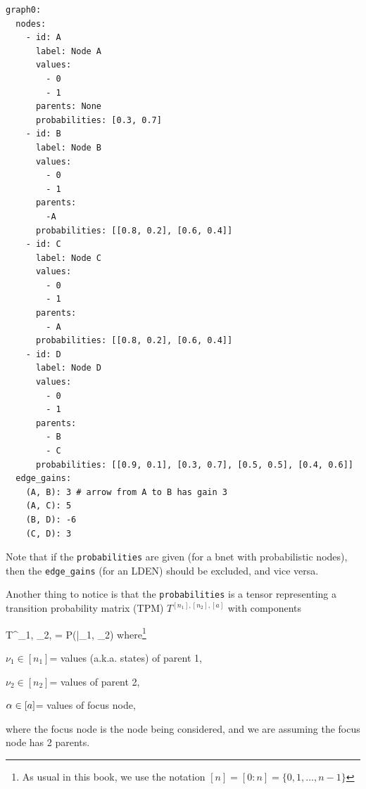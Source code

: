 \begin{mdframed}[hidealllines=true,backgroundcolor=blue!10]
\begin{verbatim}
graph0:
  nodes:
    - id: A
      label: Node A
      values: 
        - 0 
        - 1
      parents: None
      probabilities: [0.3, 0.7]
    - id: B
      label: Node B
      values: 
        - 0 
        - 1
      parents:
        -A
      probabilities: [[0.8, 0.2], [0.6, 0.4]]
    - id: C
      label: Node C
      values:
        - 0
        - 1
      parents: 
        - A   
      probabilities: [[0.8, 0.2], [0.6, 0.4]]
    - id: D
      label: Node D
      values:
        - 0
        - 1
      parents: 
        - B
        - C
      probabilities: [[0.9, 0.1], [0.3, 0.7], [0.5, 0.5], [0.4, 0.6]]
  edge_gains:
    (A, B): 3 # arrow from A to B has gain 3
    (A, C): 5
    (B, D): -6
    (C, D): 3
\end{verbatim}
\end{mdframed}

Note that if the 
{\tt probabilities}
are given (for a bnet with 
probabilistic nodes), then
the {\tt edge\_gains} (for an LDEN) should be
excluded, and vice versa.


Another thing to notice
is that the {\tt probabilities} is a tensor
representing a transition probability matrix (TPM)
$T^{[n_1], [n_2], [a]}$
with components

\beq
 T^{\nu_1, \nu_2, \alp}= P(\alp|\nu_1, \nu_2)
 \eeq
where\footnote{As usual in this book, we use the notation $[n]=[0:n]=\{0, 1, \ldots, n-1\}$}

$\nu_1\in[n_1]$= values (a.k.a. states) of parent 1,

$\nu_2\in[n_2]$= values of parent 2, 

$\alpha\in[a]$= values of focus node,

where the focus node is the node
being considered, and we are assuming the focus node has 2 parents.
